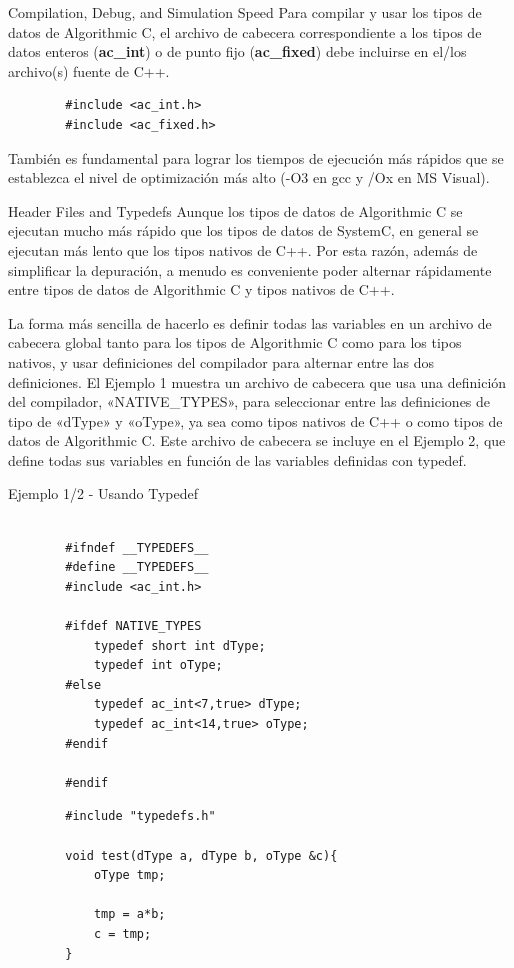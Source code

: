 \documentclass[11pt]{beamer}
\begin{document}
	\begin{frame}[fragile]{Compilation, Debug, and Simulation Speed}
		Para compilar y usar los tipos de datos de Algorithmic C, el archivo de cabecera correspondiente a los tipos de datos enteros (\textbf{ac\_int}) o de punto fijo (\textbf{ac\_fixed}) debe incluirse en el/los archivo(s) fuente de C++.\newline
		
		\begin{lstlisting}
		#include <ac_int.h>
		#include <ac_fixed.h>
	\end{lstlisting}

	También es fundamental para lograr los tiempos de ejecución más rápidos que se establezca el nivel de optimización más alto (-O3 en gcc y /Ox en MS Visual).
	
	\end{frame}


	\begin{frame}{Header Files and Typedefs}
	\justifying
	Aunque los tipos de datos de Algorithmic C se ejecutan mucho más rápido que los tipos de datos de SystemC, en general se ejecutan más lento que los tipos nativos de C++. Por esta razón, además de simplificar la depuración, a menudo es conveniente poder alternar rápidamente entre tipos de datos de Algorithmic C y tipos nativos de C++.
	
	La forma más sencilla de hacerlo es definir todas las variables en un archivo de cabecera global tanto para los tipos de Algorithmic C como para los tipos nativos, y usar definiciones del compilador para alternar entre las dos definiciones. El Ejemplo 1 muestra un archivo de cabecera que usa una definición del compilador, «NATIVE\_TYPES», para seleccionar entre las definiciones de tipo de «dType» y «oType», ya sea como tipos nativos de C++ o como tipos de datos de Algorithmic C. Este archivo de cabecera se incluye en el Ejemplo 2, que define todas sus variables en función de las variables definidas con typedef.
	\end{frame}
	
	
	\begin{frame}[fragile]{Ejemplo 1/2 - Usando Typedef}
	\begin{lstlisting}
		
		#ifndef __TYPEDEFS__
		#define __TYPEDEFS__
		#include <ac_int.h>
		
		#ifdef NATIVE_TYPES
			typedef short int dType;
			typedef int oType;
		#else
			typedef ac_int<7,true> dType;
			typedef ac_int<14,true> oType;
		#endif
		
		#endif
	\end{lstlisting}
	
	\begin{lstlisting}
		#include "typedefs.h"
		
		void test(dType a, dType b, oType &c){
			oType tmp;
			
			tmp = a*b;
			c = tmp;
		}
	\end{lstlisting}
	\end{frame}
	
\end{document}
